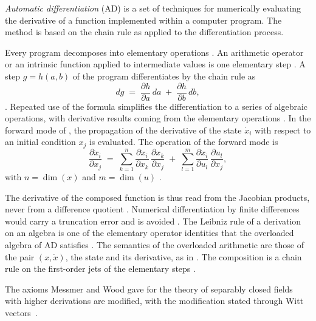 \begin{definition}\label{def:app:autodiff}
\emph{Automatic differentiation} (AD) is a set of techniques for numerically
evaluating the derivative of a function implemented within a computer
program. The method is based on the chain rule as applied to the
differentiation process.
\end{definition}

Every program decomposes into elementary operations
\cite[\S II.B]{YuanThomsonAnderson2020}. An arithmetic operator or
an intrinsic function applied to intermediate values is one elementary step
\cite[\S II.B]{YuanThomsonAnderson2020}. A step $g=h(a,b)$ of the program
differentiates by the chain rule as
\[
dg \;=\; \frac{\partial h}{\partial a}\,da \;+\; \frac{\partial h}{\partial b}\,db,
\]
\cite[equation (2)]{YuanThomsonAnderson2020}. Repeated use of the formula
simplifies the differentiation to a series of algebraic operations, with
derivative results coming from the elementary operations
\cite[\S II.B]{YuanThomsonAnderson2020}. In the forward mode of \cite[\S II.B]{YuanThomsonAnderson2020},
the propagation of the derivative of the state $\dot x_i$ with respect to an
initial condition $x_j$ is evaluated. The operation of the forward mode is
\[
\frac{\partial \dot x_i}{\partial x_j}
\;=\;
\sum_{k=1}^{n}\frac{\partial \dot x_i}{\partial x_k}\,
\frac{\partial x_k}{\partial x_j}
\;+\;
\sum_{l=1}^{m}\frac{\partial \dot x_i}{\partial u_l}\,
\frac{\partial u_l}{\partial x_j},
\]
with $n=\dim(x)$ and $m=\dim(u)$ \cite[equation
(3)]{YuanThomsonAnderson2020}.

The derivative of the composed function is thus read from the Jacobian
products, never from a difference quotient \cite[Introduction,
p.~2]{YuanThomsonAnderson2020}. Numerical differentiation by
finite differences would carry a truncation error and is avoided
\cite[Introduction, p.~2]{YuanThomsonAnderson2020}. The Leibniz rule of a
derivation on an algebra is one of the elementary operator identities that the
overloaded algebra of AD satisfies \cite[\S II.B]{YuanThomsonAnderson2020}.
The semantics of the overloaded arithmetic are those of the pair
$(x,\dot x)$, the state and its derivative, as in \cite[\S II.B]{YuanThomsonAnderson2020}. The composition is a chain rule
on the first-order jets of the elementary steps \cite[equations
(2)--(3)]{YuanThomsonAnderson2020}.

The axioms Messmer and Wood gave for the theory of separably closed fields with higher derivations are modified, with the modification stated through Witt vectors~\cite{WlWittVectorsAndSeparablyClosedF2019}.

